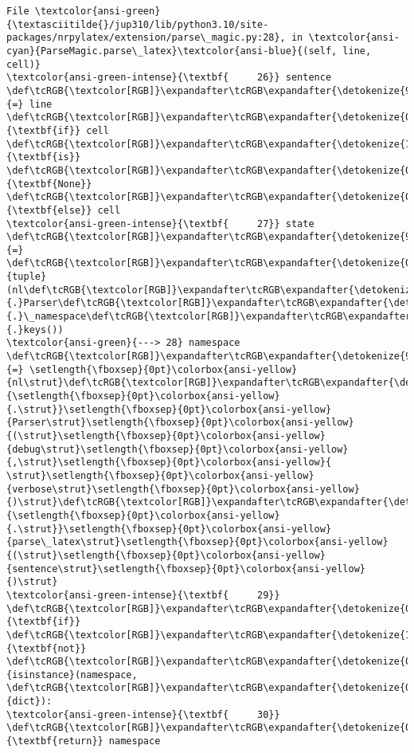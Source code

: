 \documentclass[landscape,letterpaper,10pt,english]{article}
\begin{document}
\begin{Verbatim}[commandchars=\\\{\}, frame=single, framerule=2mm, rulecolor=\color{outerrorbackground}]
File \textcolor{ansi-green}{\textasciitilde{}/jup310/lib/python3.10/site-packages/nrpylatex/extension/parse\_magic.py:28}, in \textcolor{ansi-cyan}{ParseMagic.parse\_latex}\textcolor{ansi-blue}{(self, line, cell)}
\textcolor{ansi-green-intense}{\textbf{     26}} sentence \def\tcRGB{\textcolor[RGB]}\expandafter\tcRGB\expandafter{\detokenize{98,98,98}}{=} line \def\tcRGB{\textcolor[RGB]}\expandafter\tcRGB\expandafter{\detokenize{0,135,0}}{\textbf{if}} cell \def\tcRGB{\textcolor[RGB]}\expandafter\tcRGB\expandafter{\detokenize{175,0,255}}{\textbf{is}} \def\tcRGB{\textcolor[RGB]}\expandafter\tcRGB\expandafter{\detokenize{0,135,0}}{\textbf{None}} \def\tcRGB{\textcolor[RGB]}\expandafter\tcRGB\expandafter{\detokenize{0,135,0}}{\textbf{else}} cell
\textcolor{ansi-green-intense}{\textbf{     27}} state \def\tcRGB{\textcolor[RGB]}\expandafter\tcRGB\expandafter{\detokenize{98,98,98}}{=} \def\tcRGB{\textcolor[RGB]}\expandafter\tcRGB\expandafter{\detokenize{0,135,0}}{tuple}(nl\def\tcRGB{\textcolor[RGB]}\expandafter\tcRGB\expandafter{\detokenize{98,98,98}}{.}Parser\def\tcRGB{\textcolor[RGB]}\expandafter\tcRGB\expandafter{\detokenize{98,98,98}}{.}\_namespace\def\tcRGB{\textcolor[RGB]}\expandafter\tcRGB\expandafter{\detokenize{98,98,98}}{.}keys())
\textcolor{ansi-green}{---> 28} namespace \def\tcRGB{\textcolor[RGB]}\expandafter\tcRGB\expandafter{\detokenize{98,98,98}}{=} \setlength{\fboxsep}{0pt}\colorbox{ansi-yellow}{nl\strut}\def\tcRGB{\textcolor[RGB]}\expandafter\tcRGB\expandafter{\detokenize{98,98,98}}{\setlength{\fboxsep}{0pt}\colorbox{ansi-yellow}{.\strut}}\setlength{\fboxsep}{0pt}\colorbox{ansi-yellow}{Parser\strut}\setlength{\fboxsep}{0pt}\colorbox{ansi-yellow}{(\strut}\setlength{\fboxsep}{0pt}\colorbox{ansi-yellow}{debug\strut}\setlength{\fboxsep}{0pt}\colorbox{ansi-yellow}{,\strut}\setlength{\fboxsep}{0pt}\colorbox{ansi-yellow}{ \strut}\setlength{\fboxsep}{0pt}\colorbox{ansi-yellow}{verbose\strut}\setlength{\fboxsep}{0pt}\colorbox{ansi-yellow}{)\strut}\def\tcRGB{\textcolor[RGB]}\expandafter\tcRGB\expandafter{\detokenize{98,98,98}}{\setlength{\fboxsep}{0pt}\colorbox{ansi-yellow}{.\strut}}\setlength{\fboxsep}{0pt}\colorbox{ansi-yellow}{parse\_latex\strut}\setlength{\fboxsep}{0pt}\colorbox{ansi-yellow}{(\strut}\setlength{\fboxsep}{0pt}\colorbox{ansi-yellow}{sentence\strut}\setlength{\fboxsep}{0pt}\colorbox{ansi-yellow}{)\strut}
\textcolor{ansi-green-intense}{\textbf{     29}} \def\tcRGB{\textcolor[RGB]}\expandafter\tcRGB\expandafter{\detokenize{0,135,0}}{\textbf{if}} \def\tcRGB{\textcolor[RGB]}\expandafter\tcRGB\expandafter{\detokenize{175,0,255}}{\textbf{not}} \def\tcRGB{\textcolor[RGB]}\expandafter\tcRGB\expandafter{\detokenize{0,135,0}}{isinstance}(namespace, \def\tcRGB{\textcolor[RGB]}\expandafter\tcRGB\expandafter{\detokenize{0,135,0}}{dict}):
\textcolor{ansi-green-intense}{\textbf{     30}}     \def\tcRGB{\textcolor[RGB]}\expandafter\tcRGB\expandafter{\detokenize{0,135,0}}{\textbf{return}} namespace


\end{Verbatim}
\end{document}
